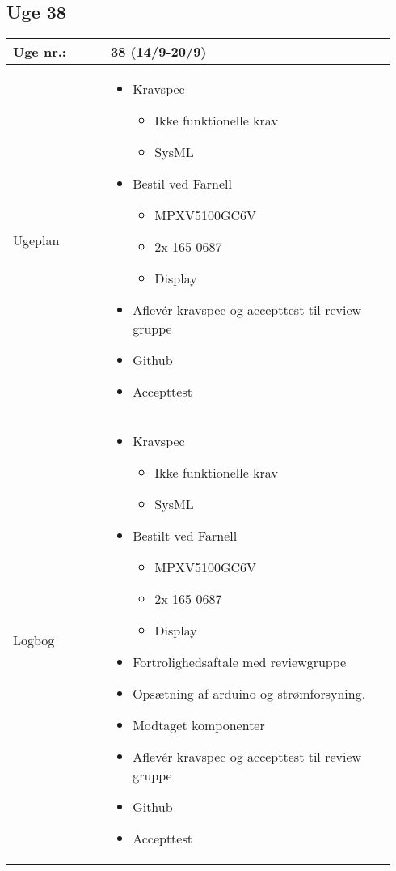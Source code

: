 	\subsection{Uge 38} \label{app:logUge38}
	\begin{longtable}{|p{0.24\linewidth}|p{0.7\linewidth}|}
		\hline
		Uge nr.: & 38 (14/9-20/9)\\ \hline
		Ugeplan & 
		\begin{itemize}
			\item Kravspec
			\begin{itemize}
				\item Ikke funktionelle krav
				\item SysML
			\end{itemize}
			\item Bestil ved Farnell
			\begin{itemize}
				\item MPXV5100GC6V
				\item 2x 165-0687
				\item Display
			\end{itemize}
			\item Aflevér kravspec og accepttest til review gruppe
			\item Github
			\item Accepttest
		\end{itemize}
		\\ \hline
		Logbog & 
		\begin{itemize}
				\item Kravspec
				\begin{itemize}
					\item Ikke funktionelle krav
					\item SysML
				\end{itemize}
				\item Bestilt ved Farnell
				\begin{itemize}
					\item MPXV5100GC6V
					\item 2x 165-0687
					\item Display
				\end{itemize}
				\item Fortrolighedsaftale med reviewgruppe
				\item Opsætning af arduino og strømforsyning.
				\item Modtaget komponenter
				\item Aflevér kravspec og accepttest til review gruppe
				\item Github
				\item Accepttest
		\end{itemize}
		\\ \hline
	\end{longtable}
	
